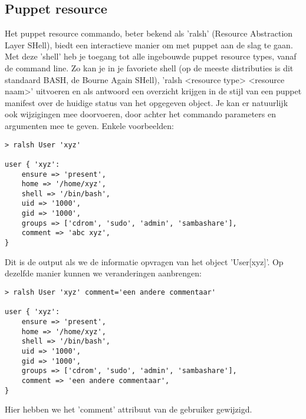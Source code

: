 \subsection{Puppet resource}
Het puppet resource commando, beter bekend als 'ralsh' (Resource Abstraction Layer SHell), biedt een interactieve manier om met puppet aan de slag te gaan. Met deze 'shell' heb je toegang tot alle ingebouwde puppet resource types, vanaf de command line. Zo kan je in je favoriete shell (op de meeste distributies is dit standaard BASH, de Bourne Again SHell), 'ralsh <resource type> <resource naam>' uitvoeren en als antwoord een overzicht krijgen in de stijl van een puppet manifest over de huidige status van het opgegeven object. Je kan er natuurlijk ook wijzigingen mee doorvoeren, door achter het commando parameters en argumenten mee te geven. Enkele voorbeelden:
\begin{code}
\begin{lstlisting}
> ralsh User 'xyz'

user { 'xyz':
	ensure => 'present',
	home => '/home/xyz',
	shell => '/bin/bash',
	uid => '1000',
	gid => '1000',
	groups => ['cdrom', 'sudo', 'admin', 'sambashare'],
	comment => 'abc xyz',
}
\end{lstlisting}
\end{code}
Dit is de output als we de informatie opvragen van het object 'User[xyz]'. Op dezelfde manier kunnen we veranderingen aanbrengen:
\begin{code}
\begin{lstlisting}
> ralsh User 'xyz' comment='een andere commentaar'

user { 'xyz':
	ensure => 'present',
	home => '/home/xyz',
	shell => '/bin/bash',
	uid => '1000',
	gid => '1000',
	groups => ['cdrom', 'sudo', 'admin', 'sambashare'],
	comment => 'een andere commentaar',
}
\end{lstlisting}
\end{code}
Hier hebben we het 'comment' attribuut van de gebruiker gewijzigd.

